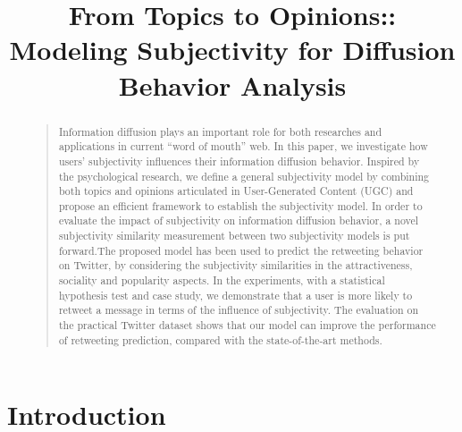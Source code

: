 \documentclass[letterpaper]{article}
\begin{document}
\title{From Topics to Opinions:: \\Modeling Subjectivity for Diffusion Behavior Analysis}
\nocopyright
\maketitle
\begin{abstract}
\begin{quote}
Information diffusion plays an important role for both researches and applications in current ``word of mouth'' web. In this paper, we investigate how users' subjectivity influences their information diffusion behavior. 
Inspired by the psychological research, we define a general subjectivity model by combining both topics and opinions articulated in User-Generated Content (UGC) and propose an efficient framework to establish the subjectivity model. 
In order to evaluate the impact of subjectivity on information diffusion behavior, a novel subjectivity similarity measurement between two subjectivity models is put forward.The proposed model has been used to predict the retweeting  behavior on Twitter, by considering the subjectivity similarities in the attractiveness, sociality and popularity aspects. In the experiments, with a statistical hypothesis test and case study, we demonstrate that a user is more likely to retweet a message in terms of the influence of subjectivity. The evaluation on the practical Twitter dataset shows that our  model can improve the performance of retweeting prediction, compared with the state-of-the-art methods.
\end{quote}
\end{abstract}

\section{Introduction}
\label{introduction}
\end{document}
